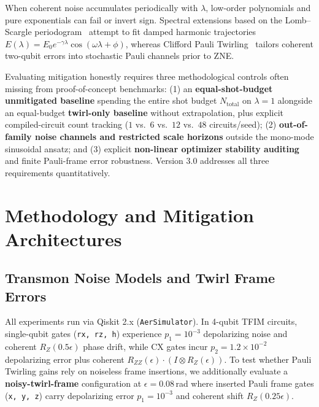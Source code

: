\documentclass[10pt,twocolumn,a4paper]{article}
\begin{document}
When coherent noise accumulates periodically with $\lambda$, low-order polynomials and pure exponentials can fail or invert sign. Spectral extensions based on the Lomb--Scargle periodogram~\cite{lomb1976,scargle1982} attempt to fit damped harmonic trajectories $E(\lambda) = E_0 e^{-\gamma \lambda}\cos(\omega \lambda + \phi)$, whereas Clifford Pauli Twirling~\cite{wallman2016,hashim2021} tailors coherent two-qubit errors into stochastic Pauli channels prior to ZNE.

Evaluating mitigation honestly requires three methodological controls often missing from proof-of-concept benchmarks: (1) an \textbf{equal-shot-budget unmitigated baseline} spending the entire shot budget $N_{\mathrm{total}}$ on $\lambda = 1$ alongside an equal-budget \textbf{twirl-only baseline} without extrapolation, plus explicit compiled-circuit count tracking ($1$ vs.\ $6$ vs.\ $12$ vs.\ $48$ circuits/seed); (2) \textbf{out-of-family noise channels and restricted scale horizons} outside the mono-mode sinusoidal ansatz; and (3) explicit \textbf{non-linear optimizer stability auditing} and finite Pauli-frame error robustness. Version 3.0 addresses all three requirements quantitatively.

\section{Methodology and Mitigation Architectures}

\subsection{Transmon Noise Models and Twirl Frame Errors}
All experiments run via Qiskit 2.x (\texttt{AerSimulator}). In 4-qubit TFIM circuits, single-qubit gates (\texttt{rx, rz, h}) experience $p_1 = 10^{-3}$ depolarizing noise and coherent $R_Z(0.5\epsilon)$ phase drift, while $\mathrm{CX}$ gates incur $p_2 = 1.2 \times 10^{-2}$ depolarizing error plus coherent $R_{ZZ}(\epsilon) \cdot (I \otimes R_Z(\epsilon))$. To test whether Pauli Twirling gains rely on noiseless frame insertions, we additionally evaluate a \textbf{noisy-twirl-frame} configuration at $\epsilon = 0.08\,$rad where inserted Pauli frame gates (\texttt{x, y, z}) carry depolarizing error $p_1 = 10^{-3}$ and coherent shift $R_Z(0.25\epsilon)$.
\end{document}

